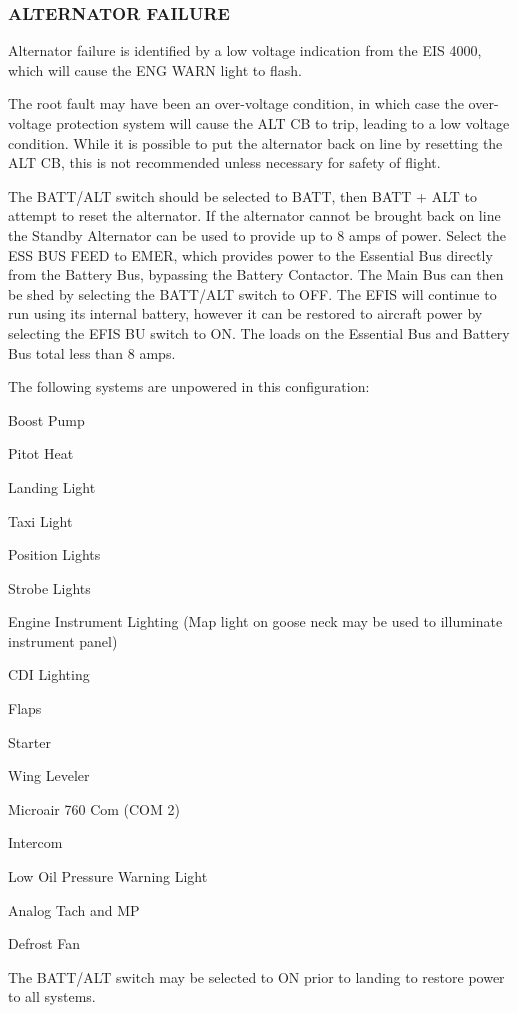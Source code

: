 \subsubsection{ALTERNATOR FAILURE}

Alternator failure is identified by a low voltage indication from
the EIS 4000, which will cause the ENG WARN light to flash.

The root fault may have been an over-voltage condition, in which case
the over-voltage protection system will cause the ALT CB to trip,
leading to a low voltage condition. While it is possible to put the
alternator back on line by resetting the ALT CB, this is not recommended
unless necessary for safety of flight.

The BATT/ALT switch should be selected to BATT, then BATT + ALT to attempt
to reset the alternator. If the alternator cannot be brought back
on line the Standby Alternator can be used to provide up to 8 amps
of power. Select the ESS BUS FEED to EMER, which provides power
to the Essential Bus directly from the Battery Bus, bypassing the
Battery Contactor. The Main Bus can then be shed by selecting the
BATT/ALT switch to OFF. The EFIS will continue to run using its internal
battery, however it can be restored to aircraft power by selecting
the EFIS BU switch to ON. The loads on the Essential Bus and
Battery Bus total less than 8 amps.

The following systems are unpowered in this configuration:

\begin{itemize*}
\item Boost Pump
\item Pitot Heat 
\item Landing Light 
\item Taxi Light 
\item Position Lights 
\item Strobe Lights 
\item Engine Instrument Lighting (Map light on goose neck may be used to
illuminate instrument panel) 
\item CDI Lighting 
\item Flaps 
\item Starter 
\item Wing Leveler 
\item Microair 760 Com (COM 2) 
\item Intercom 
\item Low Oil Pressure Warning Light 
\item Analog Tach and MP
\item Defrost Fan
\end{itemize*}
The BATT/ALT switch may be selected to ON prior to landing to restore
power to all systems.

